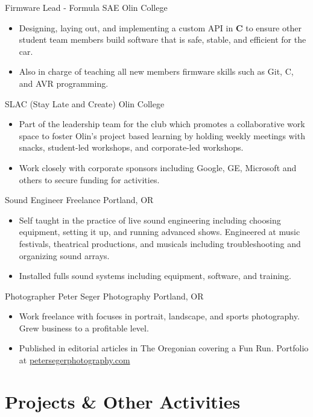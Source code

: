 \documentclass[11 pt]{moderncv}
\begin{document}
{Firmware Lead - Formula SAE}
{Olin College}
{}
{}
{
\begin{itemize}
	\item Designing, laying out, and implementing a custom API in \textbf{C} to ensure other student team members build software that is safe, stable, and efficient for the car. 
	\item Also in charge of teaching all new members firmware skills such as Git, C, and AVR programming.
\end{itemize}
}

{SLAC (Stay Late and Create)}
{Olin College}
{}
{}
{
\begin{itemize}
	\item Part of the leadership team for the club which promotes a collaborative work space to foster Olin's project based learning by holding weekly meetings with snacks, student-led workshops, and corporate-led workshops. 
	\item Work closely with corporate sponsors including Google, GE, Microsoft and others to secure funding for activities. 
\end{itemize}
}

{Sound Engineer}
{Freelance}
{Portland, OR}
{}
{
\begin{itemize}
	\item Self taught in the practice of live sound engineering including choosing equipment, setting it up, and running advanced shows. Engineered at music festivals, theatrical productions, and musicals including troubleshooting and organizing sound arrays. 
	\item Installed fulls sound systems including equipment, software, and training.
\end{itemize}
}

{Photographer}
{Peter Seger Photography}
{Portland, OR}
{}
{
\begin{itemize}
	\item Work freelance with focuses in portrait, landscape, and sports photography. Grew business to a profitable level.
	\item Published in editorial articles in The Oregonian covering a Fun Run. Portfolio at \href{www.petersegerphotography.com}{petersegerphotography.com}
\end{itemize}
}


\vspace{0.03 in}
\section{Projects \& Other Activities}
\end{document}
